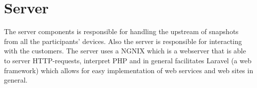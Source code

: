 \section{Server}
The server components is responsible for handling the upstream of snapshots from all the participants' devices. Also the server is responsible for interacting with the customers. The server uses a NGNIX which is a webserver that is able to server HTTP-requests, interpret PHP and in general facilitates Laravel (a web framework) which allows for easy implementation of web services and web sites in general.

